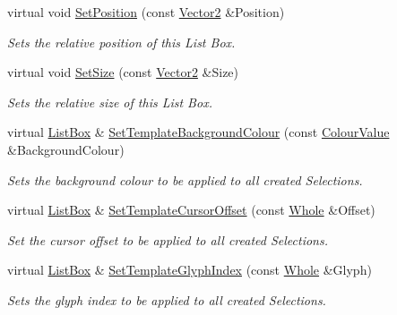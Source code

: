 \begin{DoxyCompactItemize}
virtual void \hyperlink{classphys_1_1UI_1_1ListBox_a0c4c7141142caca342157ce4460b907d}{SetPosition} (const \hyperlink{classphys_1_1Vector2}{Vector2} \&Position)
\begin{DoxyCompactList}\small\item\em Sets the relative position of this List Box. \item\end{DoxyCompactList}\item 
virtual void \hyperlink{classphys_1_1UI_1_1ListBox_a2e1f6514f83be768dad7e357beb6ac98}{SetSize} (const \hyperlink{classphys_1_1Vector2}{Vector2} \&Size)
\begin{DoxyCompactList}\small\item\em Sets the relative size of this List Box. \item\end{DoxyCompactList}\item 
virtual \hyperlink{classphys_1_1UI_1_1ListBox}{ListBox} \& \hyperlink{classphys_1_1UI_1_1ListBox_a718421466aa6769b04b5e34b29e0e01b}{SetTemplateBackgroundColour} (const \hyperlink{classphys_1_1ColourValue}{ColourValue} \&BackgroundColour)
\begin{DoxyCompactList}\small\item\em Sets the background colour to be applied to all created Selections. \item\end{DoxyCompactList}\item 
virtual \hyperlink{classphys_1_1UI_1_1ListBox}{ListBox} \& \hyperlink{classphys_1_1UI_1_1ListBox_af2a439b21e1b1a4af0cc684c25109d60}{SetTemplateCursorOffset} (const \hyperlink{namespacephys_a460f6bc24c8dd347b05e0366ae34f34a}{Whole} \&Offset)
\begin{DoxyCompactList}\small\item\em Set the cursor offset to be applied to all created Selections. \item\end{DoxyCompactList}\item 
virtual \hyperlink{classphys_1_1UI_1_1ListBox}{ListBox} \& \hyperlink{classphys_1_1UI_1_1ListBox_a4bce62d1cee20950c41897e439fb3d79}{SetTemplateGlyphIndex} (const \hyperlink{namespacephys_a460f6bc24c8dd347b05e0366ae34f34a}{Whole} \&Glyph)
\begin{DoxyCompactList}\small\item\em Sets the glyph index to be applied to all created Selections. \item\end{DoxyCompactList}\item 

\end{DoxyCompactItemize}
